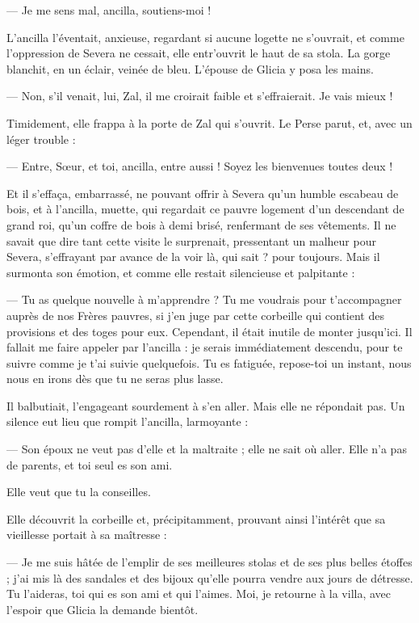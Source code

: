\documentclass[a4paper, 11pt, oneside, polutonikogreek, french]{article}
\begin{document}
--- Je me sens mal, ancilla, soutiens-moi !

L'ancilla l'éventait, anxieuse, regardant si aucune logette ne s'ouvrait, et comme l'oppression de Severa ne cessait, elle entr'ouvrit le haut de sa stola. La gorge blanchit, en un éclair, veinée de bleu. L'épouse de Glicia y posa les mains.

--- Non, s'il venait, lui, Zal, il me croirait faible et s'effraierait. Je vais mieux !

Timidement, elle frappa à la porte de Zal qui s'ouvrit. Le Perse parut, et, avec un léger trouble :

--- Entre, Sœur, et toi, ancilla, entre aussi ! Soyez les bienvenues toutes deux !

Et il s'effaça, embarrassé, ne pouvant offrir à Severa qu'un humble escabeau de bois, et à l'ancilla, muette, qui regardait ce pauvre logement d'un descendant de grand roi, qu'un coffre de bois à demi brisé, renfermant de ses vêtements. Il ne savait que dire tant cette visite le surprenait, pressentant un malheur pour Severa, s'effrayant par avance de la voir là, qui sait ? pour toujours. Mais il surmonta son émotion, et comme elle restait silencieuse et palpitante :

--- Tu as quelque nouvelle à m'apprendre ? Tu me voudrais pour t'accompagner auprès de nos Frères pauvres, si j'en juge par cette corbeille qui contient des provisions et des toges pour eux. Cependant, il était inutile de monter jusqu'ici. Il fallait me faire appeler par l'ancilla : je serais immédiatement descendu, pour te suivre comme je t'ai suivie quelquefois. Tu es fatiguée, repose-toi un instant, nous nous en irons dès que tu ne seras plus lasse.

Il balbutiait, l'engageant sourdement à s'en aller. Mais elle ne répondait pas. Un silence eut lieu que rompit l'ancilla, larmoyante :

--- Son époux ne veut pas d'elle et la maltraite ; elle ne sait où aller. Elle n'a pas de parents, et toi seul es son ami.

Elle veut que tu la conseilles.

Elle découvrit la corbeille et, précipitamment, prouvant ainsi l'intérêt que sa vieillesse portait à sa maîtresse :

--- Je me suis hâtée de l'emplir de ses meilleures stolas et de ses plus belles étoffes ; j'ai mis là des sandales et des bijoux qu'elle pourra vendre aux jours de détresse. Tu l'aideras, toi qui es son ami et qui l'aimes. Moi, je retourne à la villa, avec l'espoir que Glicia la demande bientôt.
\end{document}
